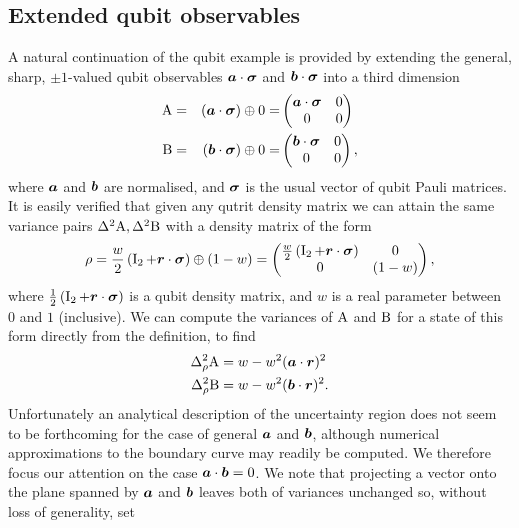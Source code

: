 \subsection{Extended qubit observables}
\label{sec:qubit-extended-uncertainty}
A natural continuation of the qubit example is provided by extending the general, sharp, $\pm 1$-valued qubit observables $\bm{a}\cdot{\boldsymbol\sigma}$ and $\bm{b}\cdot{\boldsymbol\sigma}$ into a third dimension
\begin{alignat}{3}
  \label{eqn:extended-qubit-obs-defn}
  \operatorname{A} &= &(\bm{a}\cdot{\boldsymbol\sigma}) \oplus 0 = &\begin{pmatrix}\bm{a}\cdot{\boldsymbol\sigma} & 0\\ 0 &0\\\end{pmatrix}\\
  \operatorname{B} &= &(\bm{b}\cdot{\boldsymbol\sigma}) \oplus 0 = &\begin{pmatrix}\bm{b}\cdot{\boldsymbol\sigma} & 0\\ 0 &0\\\end{pmatrix},
\end{alignat}
where $\bm{a}$ and $\bm{b}$ are normalised, and ${\boldsymbol\sigma}$ is the usual vector of qubit Pauli matrices. It is easily verified that given any qutrit density matrix we can attain the same variance pairs $\var{\opa}, \var{\opb}$ with a density matrix of the form
\begin{align}
  \rho =\frac{w}{2}\left(\operatorname{I}_2 + \bm{r}\cdot{\boldsymbol\sigma}\right) \oplus (1-w)=\begin{pmatrix}\frac{w}{2}\left(\operatorname{I}_2 + \bm{r}\cdot{\boldsymbol\sigma}\right) & 0 \\ 0& (1-w)\end{pmatrix},
\end{align}
where $\frac{1}{2}\left(\operatorname{I}_2 + \bm{r}\cdot{\boldsymbol\sigma}\right)$ is a qubit density matrix, and $w$ is a real parameter between $0$ and $1$ (inclusive). We can compute the variances of $\operatorname{A}$ and $\operatorname{B}$ for a state of this form directly from the definition, to find
\begin{align}
  \varr{\opa} &= w - w^2 (\boa\cdot\bor)^2\\
  \varr{\opb} &= w - w^2 (\bob\cdot\bor)^2.
\end{align}
Unfortunately an analytical description of the uncertainty region does not seem to be forthcoming for the case of general $\bm{a}$ and $\bm{b}$, although numerical approximations to the boundary curve may readily be computed. We therefore focus our attention on the case $\bm{a}\cdot\bm{b} = 0$. We note that projecting a vector onto the plane spanned by $\bm{a}$ and $\bm{b}$ leaves both of variances unchanged so, without loss of generality, set 

